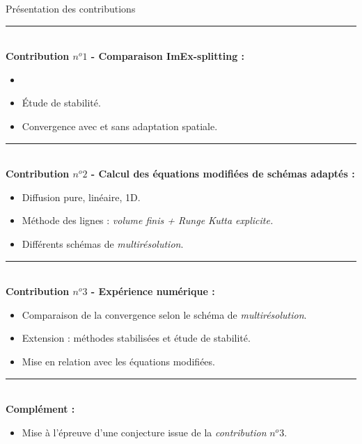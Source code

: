 \begin{frame}{Présentation des contributions}
    \noindent\color{Primary!20}\rule{\linewidth}{0.6pt}\\
    \textbf{Contribution $n^o1$ - Comparaison ImEx-splitting :\\}
    \begin{itemize}
        \item {}
        \item Étude de stabilité.
        \item Convergence avec et sans adaptation spatiale.
    \end{itemize}\pause
    \noindent\color{Primary}\rule{\linewidth}{0.6pt}\\
    \textbf{Contribution $n^o2$ - Calcul des équations modifiées de schémas adaptés :\\}\color{black}
    \begin{itemize}
        \item Diffusion pure, linéaire, 1D.
        \item Méthode des lignes : \emph{volume finis + Runge Kutta explicite.}
        \item Différents schémas de \emph{multirésolution}.
    \end{itemize}\pause
    \noindent\color{Primary}\rule{\linewidth}{0.6pt}\\
    \textbf{Contribution $n^o3$ - Expérience numérique :\\}\color{black}

    \begin{itemize}
        \item Comparaison de la convergence selon le schéma de \emph{multirésolution}.
        \item Extension : méthodes stabilisées et étude de stabilité.
        \item Mise en relation avec les équations modifiées.
    \end{itemize}\pause
    \noindent\color{red!50}\rule{\linewidth}{0.6pt}\\
    \textbf{Complément :\\}\color{black}
    \begin{itemize}
        \item Mise à l'épreuve d'une conjecture issue de la \emph{contribution} $n^o 3$.
    \end{itemize}
\end{frame}